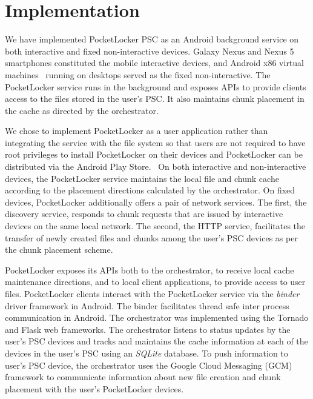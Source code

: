 
\section{Implementation}
\label{sec-implementation}

We have implemented PocketLocker PSC as an Android background service on both
interactive and fixed non-interactive devices. Galaxy Nexus and Nexus 5
smartphones constituted the mobile interactive devices, and Android x86
virtual machines~\cite{androidx86} running on desktops served as the fixed
non-interactive. The PocketLocker service runs in the background and exposes
APIs to provide clients access to the files stored in the user's PSC. It also
maintains chunk placement in the cache as directed by the orchestrator. 

We chose to implement PocketLocker as a user application rather than
integrating the service with the file system so that users are not required
to have root privileges to install PocketLocker on their devices and
PocketLocker can be distributed via the Android Play Store.~\cite{playstore}
On both interactive and non-interactive devices, the PocketLocker service
maintains the local file and chunk cache according to the placement
directions calculated by the orchestrator. On fixed devices, PocketLocker
additionally offers a pair of network services. The first, the discovery
service, responds to chunk requests that are issued by interactive devices on
the same local network. The second, the HTTP service, facilitates the
transfer of newly created files and chunks among the user's PSC devices as
per the chunk placement scheme.

PocketLocker exposes its APIs both to the orchestrator, to receive local cache
maintenance directions, and to local client applications, to provide access to
user files. PocketLocker clients interact with the PocketLocker service via the
\textit{binder} driver framework in Android. The binder facilitates thread safe
inter process communication in Android. The orchestrator was implemented using
the Tornado and Flask web frameworks. The orchestrator listens to status
updates by the user's PSC devices and tracks and maintains the cache
information at each of the devices in the user's PSC using an \textit{SQLite}
database. To push information to user's PSC device, the orchestrator uses the
Google Cloud Messaging (GCM) framework to communicate information about new
file creation and chunk placement with the user's PocketLocker devices.
